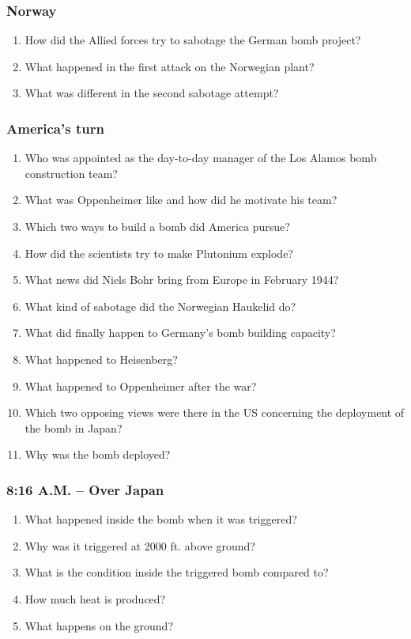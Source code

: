 \subsubsection*{Norway}
\begin{enumerate}  
\item How did the Allied forces try to sabotage the German bomb project?
\item What happened in the first attack on the Norwegian plant? 
\item What was different in the second sabotage attempt?
\end{enumerate}

\subsubsection*{America’s turn}
\begin{enumerate}  
\item Who was appointed as the day-to-day manager of the Los Alamos bomb construction team?
\item What was Oppenheimer like and how did he motivate his team? 
\item Which two ways to build a bomb did America pursue?
\item How did the scientists try to make Plutonium explode?
\item What news did Niels Bohr bring from Europe in February 1944?
\item What kind of sabotage did the Norwegian Haukelid do?
\item What did finally happen to Germany’s bomb building capacity?
\item What happened to Heisenberg?
\item What happened to Oppenheimer after the war?
\item Which two opposing views were there in the US concerning the deployment of the bomb in Japan?
\item Why was the bomb deployed?
\end{enumerate}

\subsubsection*{8:16 A.M. – Over Japan}
\begin{enumerate}  
\item What happened inside the bomb when it was triggered?
\item Why was it triggered at 2000 ft. above ground? 
\item What is the condition inside the triggered bomb compared to?
\item How much heat is produced?
\item What happens on the ground?
\end{enumerate}

